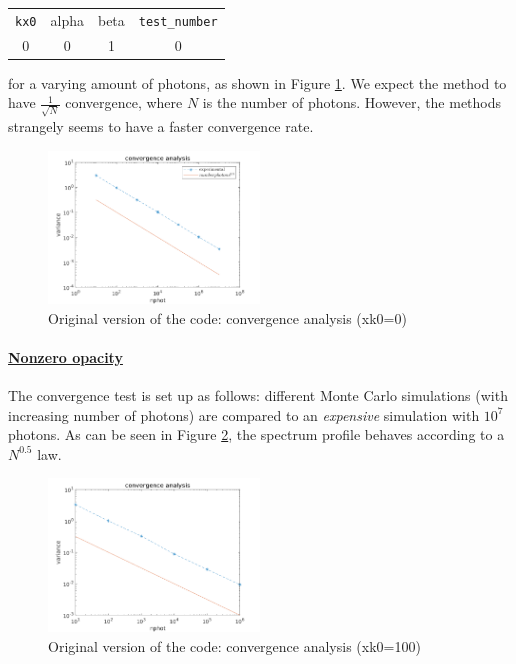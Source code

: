 \documentclass[../main/main.tex]{subfiles}
\begin{document}
\begin{center}
\centering
{\tabulinesep=1.5mm
\begin{tabu}{|c|c|c|c|}
\hline 
\texttt{kx0} & alpha & beta & \texttt{test\_number} \\
0 & 0 & 1 & 0 \\ \hline
\end{tabu}}
\end{center}

for a varying amount of photons, as shown in Figure \ref{Convergence_Pcyg_kx0_0}. We expect the method to have $\frac{1}{\sqrt{N}}$ convergence, where $N$ is the number of photons. However, the methods strangely seems to have a faster convergence rate. 

\begin{figure}[!htp]
\centering
\includegraphics[width=0.5\textwidth]{../../introductory_exercises/P_Cygni_profile_UV_resonance/data/test0_convergence.png}
\caption{Original version of the code: convergence analysis (xk0=0)}
\label{Convergence_Pcyg_kx0_0}
\end{figure}

\paragraph{\underline{Nonzero opacity}} 
The convergence test is set up as follows: different Monte Carlo simulations (with increasing number of photons) are compared to an \textit{expensive} simulation with $10^7$ photons. As can be seen in Figure \ref{Convergence_Pcyg_kx0_100}, the spectrum profile behaves according to a $N^{0.5}$ law.

\begin{figure}[!htp]
\centering
\includegraphics[width=0.5\textwidth]{../../introductory_exercises/P_Cygni_profile_UV_resonance/data/profile_convergence/test0_convergence.png}
\caption{Original version of the code: convergence analysis (xk0=100)}
\label{Convergence_Pcyg_kx0_100}
\end{figure}
\end{document}
